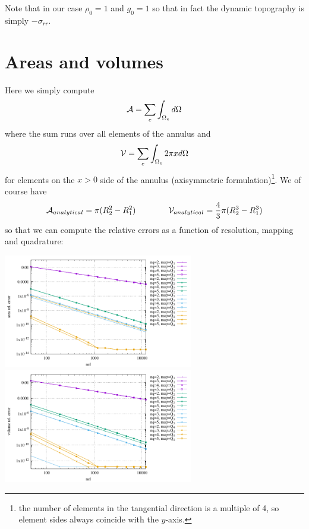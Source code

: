 Note that in our case $\rho_0=1$ and $g_0=1$ so that in fact the dynamic topography 
is simply $-\sigma_{rr}$.










\newpage
\section*{Areas and volumes}

Here we simply compute 
\[
{\cal A} = \sum_e \int_{\Omega_e} d\Omega
\]
where the sum runs over all elements of the annulus
and 
\[
{\cal V} = \sum_e \int_{\Omega_e} 2\pi x d\Omega
\]
for elements on the $x>0$ side of the annulus (axisymmetric formulation)\footnote{the number of elements in the 
tangential direction is a multiple of 4, so element sides always coincide with the $y$-axis.}.
We of course have 
\[
{\cal A}_{analytical} = \pi (R_2^2-R_1^2)
\qquad\qquad
{\cal V}_{analytical} = \frac43 \pi (R_2^3-R_1^3)
\]
so that we can compute the relative errors as a function of resolution, mapping and quadrature: 
\begin{center}
\includegraphics[width=8.3cm]{python_codes/fieldstone_152/results/areas/areas.pdf}
\includegraphics[width=8.3cm]{python_codes/fieldstone_152/results/areas/volumes.pdf}
\end{center}

